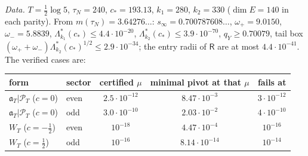 \documentclass[10pt]{amsart}
\theoremstyle{definition}
\theoremstyle{remark}
\newcommand{\PT}{\mathcal P_T}
\begin{document}
\emph{Data.} $T=\frac12\log5$, $\tau_N=240$, $c_*=193.13$, $k_1=280$, $k_2=330$ ($\dim E=140$ in each parity).
From $m(\tau_N)=3.64276\ldots$: $s_\infty=0.700787608\ldots$, $\omega_+=9.0150$, $\omega_-=5.8839$,
$\Lambda^*_{k_1}(c_*)\le4.4\cdot10^{-20}$, $\Lambda^*_{k_2}(c_*)\le3.9\cdot10^{-70}$, $q_Y\ge0.70079$, tail
box $(\omega_++\omega_-)\Lambda^*_{k_2}(c_*)^{1/2}\le2.9\cdot10^{-34}$; the entry radii of $\mathsf R$ are at
most $4.4\cdot10^{-41}$. The verified cases are:
\begin{center}\small
\begin{tabular}{@{}llccc@{}}
\toprule
form & sector & certified $\mu$ & minimal pivot at that $\mu$ & fails at\\
\midrule
$\mathfrak a_T|\PT$ ($c=0$) & even & $2.5\cdot10^{-12}$ & $8.47\cdot10^{-3}$ & $3\cdot10^{-12}$\\
$\mathfrak a_T|\PT$ ($c=0$) & odd & $3.0\cdot10^{-10}$ & $2.03\cdot10^{-2}$ & $4\cdot10^{-10}$\\
$W_T$ ($c=-\frac12$) & even & $10^{-18}$ & $4.47\cdot10^{-4}$ & $10^{-16}$\\
$W_T$ ($c=\frac12$) & odd & $10^{-16}$ & $8.14\cdot10^{-14}$ & $10^{-14}$\\
\bottomrule
\end{tabular}
\end{center}
\end{document}
